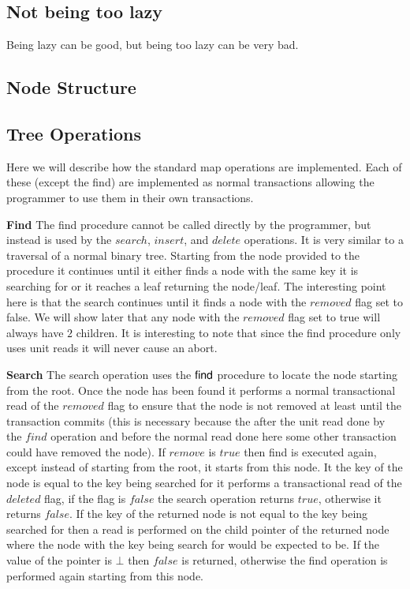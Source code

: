 \documentclass[10pt]{sigplanconf}
\begin{document}
\subsection{Not being too lazy}
Being lazy can be good, but being too lazy can be very bad.

\subsection{Node Structure}

\subsection{Tree Operations}
Here we will describe how the standard map operations are implemented.
Each of these (except the find) are implemented as normal transactions allowing the programmer to use them in their own transactions.

{\bf Find} The find procedure cannot be called directly by the programmer, but instead is used by the $search$, $insert$, and $delete$ operations.
It is very similar to a traversal of a normal binary tree.
Starting from the node provided to the procedure it continues until it either finds a node with the same key it is searching for or it reaches a leaf returning the node/leaf.
The interesting point here is that the search continues until it finds a node with the $removed$ flag set to false.
We will show later that any node with the $removed$ flag set to true will always have $2$ children.
It is interesting to note that since the find procedure only uses unit reads it will never cause an abort.

{\bf Search} The search operation uses the ${\sf find}$ procedure to locate the node starting from the root.
Once the node has been found it performs a normal transactional read of the $removed$ flag to ensure that the node is not removed at least until the transaction commits (this is necessary because the after the unit read done by the $find$ operation and before the normal read done here some other transaction could have removed the node).
If $remove$ is $true$ then find is executed again, except instead of starting from the root, it starts from this node.
It the key of the node is equal to the key being searched for it performs a transactional read of the $deleted$ flag, if the flag is $false$ the search operation returns $true$, otherwise it returns $false$.
If the key of the returned node is not equal to the key being searched for then a read is performed on the child pointer of the returned node where the node with the key being search for would be expected to be.
If the value of the pointer is $\bot$ then $false$ is returned, otherwise the find operation is performed again starting from this node.
\end{document}
